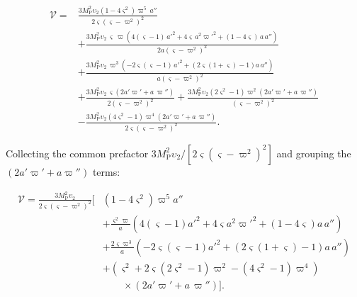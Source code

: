 \documentclass{article}
\newcommand{\Mp}{M_{\mathrm{P}}}
\begin{document}
\begin{equation}
\begin{aligned}
\mathcal{V} = {}& \frac{3 \Mp^2 \upsilon_2 \left(1 - 4 \varsigma^2\right) \varpi^5\, a''}{2 \varsigma \left(\varsigma - \varpi^2\right)^2} \\
&+ \frac{3 \Mp^2 \upsilon_2\, \varsigma\, \varpi \left(4 (\varsigma - 1)\, a'^2 + 4 \varsigma\, a^2 \varpi'^2 + (1 - 4 \varsigma)\, a\, a''\right)}{2 a \left(\varsigma - \varpi^2\right)^2} \\
&+ \frac{3 \Mp^2 \upsilon_2\, \varpi^3 \left(-2 \varsigma (\varsigma - 1)\, a'^2 + \left(2 \varsigma (1 + \varsigma) - 1\right) a\, a''\right)}{a \left(\varsigma - \varpi^2\right)^2} \\
&+ \frac{3 \Mp^2 \upsilon_2\, \varsigma \left(2 a' \varpi' + a\, \varpi''\right)}{2 \left(\varsigma - \varpi^2\right)^2}
+ \frac{3 \Mp^2 \upsilon_2 \left(2 \varsigma^2 - 1\right) \varpi^2 \left(2 a' \varpi' + a\, \varpi''\right)}{\left(\varsigma - \varpi^2\right)^2} \\
&- \frac{3 \Mp^2 \upsilon_2 \left(4 \varsigma^2 - 1\right) \varpi^4 \left(2 a' \varpi' + a\, \varpi''\right)}{2 \varsigma \left(\varsigma - \varpi^2\right)^2} .
\end{aligned}
\end{equation}

Collecting the common prefactor $3 \Mp^2 \upsilon_2 / \left[2 \varsigma (\varsigma - \varpi^2)^2\right]$ and grouping the $\left(2 a' \varpi' + a \varpi''\right)$ terms:

\begin{equation}
\begin{aligned}
\mathcal{V} = \frac{3 \Mp^2 \upsilon_2}{2 \varsigma \left(\varsigma - \varpi^2\right)^2} \Big[
& \left(1 - 4 \varsigma^2\right) \varpi^5 a'' \\
&+ \frac{\varsigma^2 \varpi}{a}\left(4 (\varsigma - 1) a'^2 + 4 \varsigma a^2 \varpi'^2 + (1 - 4 \varsigma) a\, a''\right) \\
&+ \frac{2 \varsigma \varpi^3}{a}\left(-2 \varsigma (\varsigma - 1) a'^2 + \left(2 \varsigma (1 + \varsigma) - 1\right) a\, a''\right) \\
&+ \left(\varsigma^2 + 2 \varsigma \left(2 \varsigma^2 - 1\right) \varpi^2 - \left(4 \varsigma^2 - 1\right) \varpi^4\right) \\
&\qquad \times \left(2 a' \varpi' + a\, \varpi''\right)
\Big] .
\end{aligned}
\end{equation}
\end{document}
